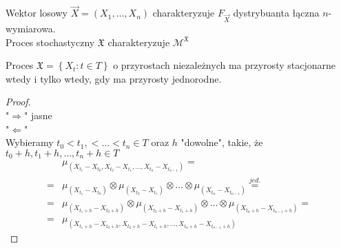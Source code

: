 Wektor losowy $ \overrightarrow{X}=\left(X_1,\dots,X_n\right) $ charakteryzuje $ F_{\overrightarrow{X}} $ dystrybuanta łączna $ n $-wymiarowa.\\
Proces stochastyczny $ \mathfrak X $ charakteryzuje $ \mathcal{M}^\mathfrak X $
\begin{lem}
Proces $ \mathfrak X=\left\{X_t:t\in T\right\} $ o przyrostach niezależnych ma przyrosty stacjonarne wtedy i tylko wtedy, gdy ma przyrosty jednorodne.
\end{lem}
\begin{proof}
\text{ }\\
"$ \Rightarrow $" jasne\\
"$ \Leftarrow $"\\
Wybieramy $ t_0<t_1,<\dots<t_n\in T $ oraz $ h $ "dowolne", takie, że\\
$ t_0+h,t_1+h,\dots,t_n+h\in T $
\begin{align*}
&\mu_{\left(X_{t_1}-X_{t_0},X_{t_2}-X_{t_1},\dots,X_{t_n}-X_{t_{n-1}}\right)}
=\\=&
\mu_{\left(X_{t_1}-X_{t_0}\right)}
\otimes
\mu_{\left(X_{t_2}-X_{t_1}\right)}
\otimes\dots\otimes
\mu_{\left(X_{t_n}-X_{t_{n-1}}\right)}
\stackrel{jed.}{=}\\=&
\mu_{\left(X_{t_1+h}-X_{t_0+h}\right)}
\otimes
\mu_{\left(X_{t_2+h}-X_{t_1+h}\right)}
\otimes\dots\otimes
\mu_{\left(X_{t_n+h}-X_{t_{n-1}+h}\right)}
=\\=&
\mu_{\left(X_{t_1+h}-X_{t_0+h},X_{t_2+h}-X_{t_1+h},\dots,X_{t_n+h}-X_{t_{n-1}+h}\right)}
\end{align*}
\end{proof}